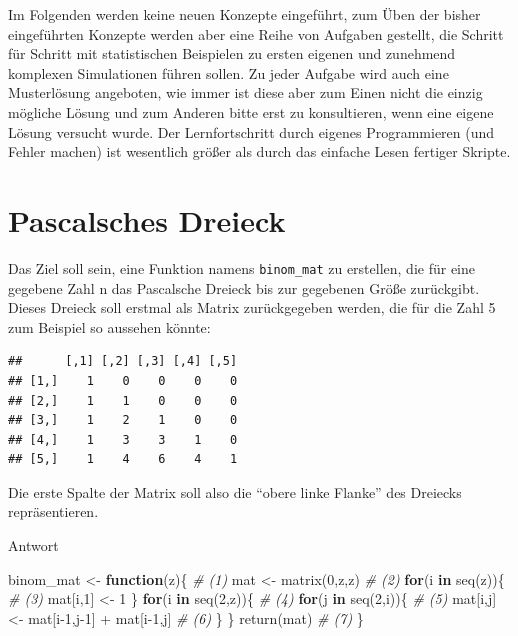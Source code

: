 \documentclass[
]{book}
\newenvironment{Shaded}{\begin{snugshade}}{\end{snugshade}}
\newcommand{\CommentTok}[1]{\textcolor[rgb]{0.56,0.35,0.01}{\textit{#1}}}
\newcommand{\ControlFlowTok}[1]{\textcolor[rgb]{0.13,0.29,0.53}{\textbf{#1}}}
\newcommand{\DecValTok}[1]{\textcolor[rgb]{0.00,0.00,0.81}{#1}}
\newcommand{\FunctionTok}[1]{\textcolor[rgb]{0.00,0.00,0.00}{#1}}
\newcommand{\NormalTok}[1]{#1}
\newcommand{\OtherTok}[1]{\textcolor[rgb]{0.56,0.35,0.01}{#1}}
\newcommand{\SpecialCharTok}[1]{\textcolor[rgb]{0.00,0.00,0.00}{#1}}
\begin{document}
Im Folgenden werden keine neuen Konzepte eingeführt, zum Üben der bisher eingeführten Konzepte werden aber eine Reihe von Aufgaben gestellt, die Schritt für Schritt mit statistischen Beispielen zu ersten eigenen und zunehmend komplexen Simulationen führen sollen.
Zu jeder Aufgabe wird auch eine Musterlösung angeboten, wie immer ist diese aber zum Einen nicht die einzig mögliche Lösung und zum Anderen bitte erst zu konsultieren, wenn eine eigene Lösung versucht wurde.
Der Lernfortschritt durch eigenes Programmieren (und Fehler machen) ist wesentlich größer als durch das einfache Lesen fertiger Skripte.

\hypertarget{pascalsches-dreieck}{%
\section{Pascalsches Dreieck}\label{pascalsches-dreieck}}

Das Ziel soll sein, eine Funktion namens \texttt{binom\_mat} zu erstellen, die für eine gegebene Zahl n das Pascalsche Dreieck bis zur gegebenen Größe zurückgibt.
Dieses Dreieck soll erstmal als Matrix zurückgegeben werden, die für die Zahl 5 zum Beispiel so aussehen könnte:

\begin{verbatim}
##      [,1] [,2] [,3] [,4] [,5]
## [1,]    1    0    0    0    0
## [2,]    1    1    0    0    0
## [3,]    1    2    1    0    0
## [4,]    1    3    3    1    0
## [5,]    1    4    6    4    1
\end{verbatim}

Die erste Spalte der Matrix soll also die ``obere linke Flanke'' des Dreiecks repräsentieren.

Antwort

\begin{Shaded}
\begin{Highlighting}[]
\NormalTok{binom\_mat }\OtherTok{\textless{}{-}} \ControlFlowTok{function}\NormalTok{(z)\{                    }\CommentTok{\# (1)}
\NormalTok{  mat }\OtherTok{\textless{}{-}} \FunctionTok{matrix}\NormalTok{(}\DecValTok{0}\NormalTok{,z,z)                       }\CommentTok{\# (2)}
  \ControlFlowTok{for}\NormalTok{(i }\ControlFlowTok{in} \FunctionTok{seq}\NormalTok{(z))\{                          }\CommentTok{\# (3)}
\NormalTok{    mat[i,}\DecValTok{1}\NormalTok{] }\OtherTok{\textless{}{-}} \DecValTok{1}
\NormalTok{  \}}
  \ControlFlowTok{for}\NormalTok{(i }\ControlFlowTok{in} \FunctionTok{seq}\NormalTok{(}\DecValTok{2}\NormalTok{,z))\{                        }\CommentTok{\# (4)}
    \ControlFlowTok{for}\NormalTok{(j }\ControlFlowTok{in} \FunctionTok{seq}\NormalTok{(}\DecValTok{2}\NormalTok{,i))\{                      }\CommentTok{\# (5)}
\NormalTok{      mat[i,j] }\OtherTok{\textless{}{-}}\NormalTok{ mat[i}\DecValTok{{-}1}\NormalTok{,j}\DecValTok{{-}1}\NormalTok{] }\SpecialCharTok{+}\NormalTok{ mat[i}\DecValTok{{-}1}\NormalTok{,j]  }\CommentTok{\# (6)}
\NormalTok{    \}}
\NormalTok{  \}}
  \FunctionTok{return}\NormalTok{(mat)                                }\CommentTok{\# (7)}
\NormalTok{\}}
\end{Highlighting}
\end{Shaded}
\end{document}
